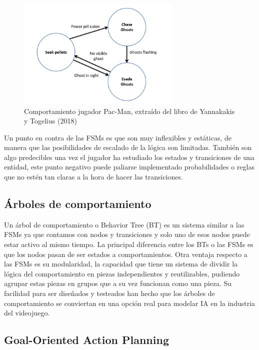 \begin{figure}[h]
	\centering
	\includegraphics[width = 0.7\textwidth]{Imagenes/FMS_MsPac-man.png}
	\caption{Comportamiento jugador Pac-Man, extraído del libro de Yannakakis y Togelius (2018)}
	\label{fig:Comportamiento jugador Pac-Man}
\end{figure}

Un punto en contra de las FSMs es que son muy inflexibles y estáticas, de manera que las posibilidades de escalado de la lógica son limitadas. También son algo predecibles una vez el jugador ha estudiado los estados y transiciones de una entidad, este punto negativo puede paliarse implementado probabilidades o reglas que no estén tan claras a la hora de hacer las transiciones.

\subsection{Árboles de comportamiento}

Un árbol de comportamiento o Behavior Tree (BT) es un sistema similar a las FSMs ya que contamos con nodos y transiciones y solo uno de esos nodos puede estar activo al mismo tiempo. 
La principal diferencia entre los BTs o las FSMs es que los nodos pasan de ser estados a comportamientos.
Otra ventaja respecto a las FSMs es su modularidad, la capacidad que tiene un sistema de dividir la lógica del comportamiento en piezas independientes y reutilizables, pudiendo agrupar estas piezas en grupos que a su vez funcionan como una pieza.
Su facilidad para ser diseñados y testeados han hecho que los árboles de comportamiento se conviertan en una opción real para modelar IA en la industria del videojuego.

\subsection{Goal-Oriented Action Planning}
\\ 
